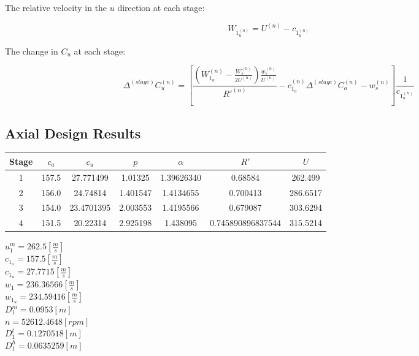 \documentclass[titlepage]{article}
\begin{document}
The relative velocity in the $u$ direction at each stage:

\begin{equation}
    W_{1_{u}^{(n)}} = U^{(n)} - c_{1_{u}^{(n)}}
\end{equation}

The change in $C_{u}$ at each stage:

\begin{equation}
    \Delta^{(stage)} C_{u}^{(n)} = \left[ \frac{\left( W_{1_{u}}^{(n)} - \frac{W_{s}^{(n)}}{2U^{(n)}}\right) \frac{w_{s}^{(n)}}{U^{(n)}}}{R'^{(n)}}  - c_{1_{a}}^{(n)} \Delta^{(stage)} C_{a}^{(n)} - w_{s}^{(n)} \right] \frac{1}{c_{1_{u}^{(n)}}}
\end{equation}

\subsection{Axial Design Results}

\begin{center} 
    \begin{tabular}{|c|c|c|c|c|c|c|}
        \hline
        Stage & $c_{a}$ & $c_{u}$ & $p$ & $\alpha$ & $R'$ & $U$ \\
        \hline
        1 & 157.5 & 27.771499 & 1.01325 & 1.39626340 & 0.68584 & 262.499 \\
        \hline
        2 & 156.0 & 24.74814 & 1.401547 & 1.4134655 & 0.700413 & 286.6517 \\
        \hline
        3 & 154.0 & 23.4701395 & 2.003553 & 1.4195566 & 0.679087 & 303.6294 \\
        \hline
        4 & 151.5 & 20.22314 & 2.925198 & 1.438095 & 0.745890896837544 & 315.5214 \\
        \hline
        
    \end{tabular}
\end{center}

\vspace*{1cm}

\begin{center} 
    $u_{1}^{m} = 262.5 [\frac{m}{s}]$ \\
    $c_{1_{a}} = 157.5 [\frac{m}{s}]$ \\
    $c_{1_{u}} = 27.7715 [\frac{m}{s}]$ \\
    $w_{1} = 236.36566 [\frac{m}{s}]$ \\
    $w_{1_{u}} = 234.59416 [\frac{m}{s}]$ \\
    $D_{1}^{m} = 0.0953 [m]$ \\
    $n = 52612.4648 [rpm]$ \\
    $D_{1}^{t} = 0.1270518 [m]$ \\
    $D_{1}^{h} = 0.0635259 [m]$ \\
\end{center}
\end{document}
